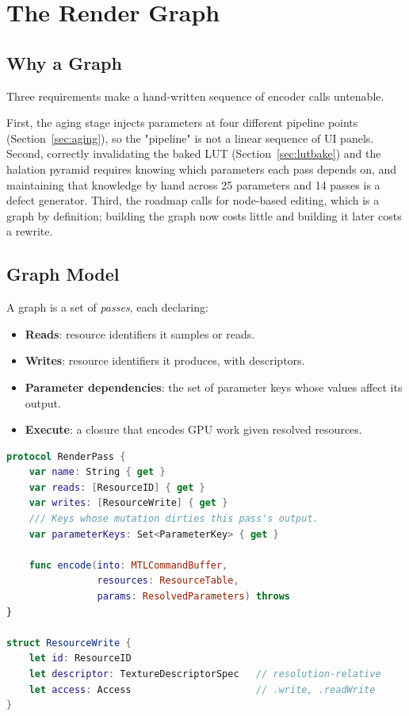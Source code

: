 \section{The Render Graph}
\label{sec:rendergraph}

\subsection{Why a Graph}

Three requirements make a hand-written sequence of encoder calls untenable.

First, the aging stage injects parameters at four different pipeline points
(Section~\ref{sec:aging}), so the "pipeline" is not a linear sequence of UI
panels. Second, correctly invalidating the baked LUT
(Section~\ref{sec:lutbake}) and the halation pyramid requires knowing which
parameters each pass depends on, and maintaining that knowledge by hand across
25 parameters and 14 passes is a defect generator. Third, the roadmap calls for
node-based editing, which is a graph by definition; building the graph now costs
little and building it later costs a rewrite.

\subsection{Graph Model}

A graph is a set of \emph{passes}, each declaring:

\begin{itemize}
\item \textbf{Reads}: resource identifiers it samples or reads.
\item \textbf{Writes}: resource identifiers it produces, with descriptors.
\item \textbf{Parameter dependencies}: the set of parameter keys whose values
affect its output.
\item \textbf{Execute}: a closure that encodes GPU work given resolved
resources.
\end{itemize}

\begin{lstlisting}[language=Swift, caption={Pass declaration.}, label={lst:pass}]
protocol RenderPass {
    var name: String { get }
    var reads: [ResourceID] { get }
    var writes: [ResourceWrite] { get }
    /// Keys whose mutation dirties this pass's output.
    var parameterKeys: Set<ParameterKey> { get }

    func encode(into: MTLCommandBuffer,
                resources: ResourceTable,
                params: ResolvedParameters) throws
}

struct ResourceWrite {
    let id: ResourceID
    let descriptor: TextureDescriptorSpec   // resolution-relative
    let access: Access                      // .write, .readWrite
}
\end{lstlisting}

